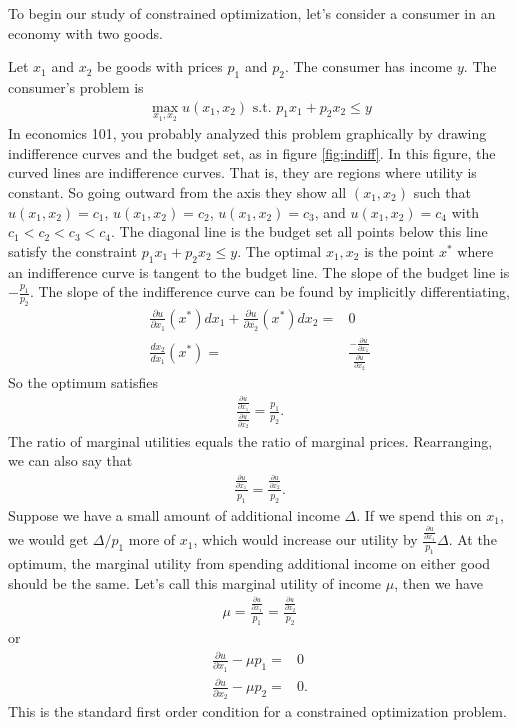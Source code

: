 To begin our study of constrained optimization, let's consider a
consumer in an economy with two goods. 
\begin{example}\label{ex:consumer}
  Let $x_1$ and $x_2$ be goods with prices $p_1$ and $p_2$. The
  consumer has income $y$. The consumer's problem is
  \begin{align*}
    \max_{x_1,x_2} u(x_1,x_2) \text{ s.t. } p_1 x_1 + p_2 x_2 \leq y
  \end{align*}
  In economics 101, you probably analyzed this problem graphically by
  drawing indifference curves and the budget set, as in figure
  \ref{fig:indiff}. In this figure, the curved lines are indifference
  curves. That is, they are regions where utility is constant. So going
  outward from the axis they show all $(x_1,x_2)$ such that $u(x_1, x_2)
  = c_1$, $u(x_1, x_2) = c_2$, $u(x_1, x_2) = c_3$, and $u(x_1, x_2) =
  c_4$ with $c_1 < c_2 < c_3 < c_4$. The diagonal line is the budget set
  all points below this line satisfy the constraint $p_1 x_1 + p_2 x_2
  \leq y$. The optimal $x_1, x_2$ is the point $x^*$ where an
  indifference curve is tangent to the budget line. The slope of the
  budget line is $-\frac{p_1}{p_2}$. The slope of the indifference curve
  can be found by implicitly differentiating,
  \begin{align*}
    \frac{\partial u}{\partial x_1}(x^*) dx_1 + \frac{\partial
      u}{\partial x_2}(x^*) dx_2 = & 0 \\
    \frac{dx_2}{dx_1}(x^*) = & \frac{-\frac{\partial u}{\partial x_1}}
    {\frac{\partial u}{\partial x_2}} 
  \end{align*}
  So the optimum satisfies
  \begin{align*}
    \frac{\frac{\partial u}{\partial x_1}}
    {\frac{\partial u}{\partial x_2}} = \frac{p_1}{p_2}.
  \end{align*}
  The ratio of marginal utilities equals the ratio of marginal
  prices. Rearranging, we can also say that
  \begin{align*}
    \frac{\frac{\partial u}{\partial x_1}}{p_1} = \frac{\frac{\partial u}{\partial x_2}}{p_2}.
  \end{align*}
  Suppose we have a small amount of additional income $\Delta$. If we
  spend this on $x_1$, we would get $\Delta/p_1$ more of $x_1$, which
  would increase our utility by $\frac{\frac{\partial u}{\partial
      x_1}}{p_1} \Delta$. At the optimum, the marginal utility from
  spending additional income on either good should be the same. Let's
  call this marginal utility of income $\mu$, then we have 
  \begin{align*}
    \mu = \frac{\frac{\partial u}{\partial x_1}}{p_1} =
    \frac{\frac{\partial u}{\partial x_2}}{p_2} 
  \end{align*}
  or 
  \begin{align*}
    \frac{\partial u}{\partial x_1} - \mu p_1 = & 0 \\
    \frac{\partial u}{\partial x_2} - \mu p_2 = & 0.
  \end{align*}
  This is the standard first order condition for a constrained
  optimization problem. 
\end{example}

